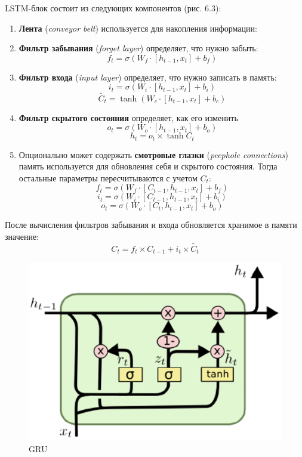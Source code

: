 LSTM-блок состоит из следующих компонентов (рис. 6.3):
\begin{enumerate}
    \item \textbf{Лента} (\textit{conveyor belt}) используется для накопления информации:
    \item \textbf{Фильтр забывания} (\textit{forget layer}) определяет, что нужно забыть:
    \[
        f_t=\sigma(W_f\cdot[h_{t-1},x_t]+b_f)
    \]
    \item \textbf{Фильтр входа} (\textit{input layer}) определяет, что нужно записать в память:
    \[
        i_t=\sigma(W_i\cdot[h_{t-1},x_t]+b_i)
    \]
    \[
        \widetilde{C_t}=\tanh(W_c\cdot[h_{t-1},x_t]+b_c)
    \]
    \item \textbf{Фильтр скрытого состояния} определяет, как его изменить
    \[
        o_t=\sigma(W_o\cdot[h_{t-1},x_t]+b_o)
    \]
    \[
        h_t=o_t\times\tanh C_t
    \]
    \item Опционально может содержать \textbf{смотровые глазки} (\textit{peephole connections}) память используется для обновления  себя и скрытого состояния. Тогда остальные параметры пересчитываются с учетом $C_t$:
    \[
        f_t=\sigma(W_f\cdot[C_{t-1},h_{t-1},x_t]+b_f)
    \]
    \[
        i_t=\sigma(W_i\cdot[C_{t-1},h_{t-1},x_t]+b_i)
    \]
    \[
        o_t=\sigma(W_o\cdot[C_t,h_{t-1},x_t]+b_o)
    \]
\end{enumerate}

\begin{remark}
    После вычисления фильтров забывания и входа обновляется хранимое в памяти значение:
    \[
        C_t=f_t\times C_{t-1}+i_t\times \widetilde{C_t}
    \]
\end{remark}

\begin{figure}
    \centering
    \includegraphics[scale=0.3]{images/gru.png}
    \caption{GRU}
\end{figure}

